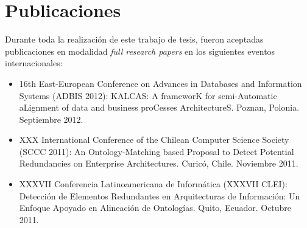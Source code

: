 \section{Publicaciones} \label{sec:publish}
Durante toda la realizaci\'on de este trabajo de tesis, fueron aceptadas publicaciones en modalidad \textit{full research papers} en los siguientes eventos internacionales:

\begin{itemize}

\item 16th East-European Conference on Advances in Databases and Information Systems
(ADBIS 2012): KALCAS: A frameworK for semi-Automatic aLignment of data and business proCesses ArchitectureS. Poznan, Polonia. Septiembre 2012.

\item XXX International Conference of the Chilean Computer Science Society (SCCC 2011): An Ontology-Matching based Proposal to Detect Potential Redundancies on Enterprise Architectures. Curic\'o, Chile. Noviembre 2011.

\item XXXVII Conferencia Latinoamericana de Inform\'atica (XXXVII CLEI): Detecci\'on de Elementos Redundantes en
Arquitecturas de Informaci\'on: Un Enfoque Apoyado en Alineaci\'on de Ontolog\'ias. Quito, Ecuador. Octubre 2011.

\end{itemize}


